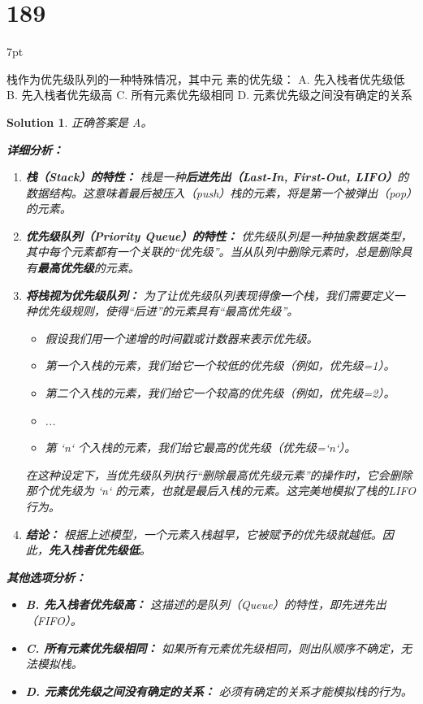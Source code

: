 \documentclass[UTF8]{report}
\newtheorem{solution}{Solution}
\theoremstyle{MyLineTheoremStyle} %
\theoremstyle{MyBlockTheoremStyle} %
\theoremstyle{MySubsubsectionStyle} %
\newenvironment{graybox}{%
        \def\FrameCommand{%
        \hspace{1pt}%
        {\color{gray}\small \vrule width 2pt}%
        {\color{graybox_color}\vrule width 4pt}%
        \colorbox{graybox_color}%
        }%
        \MakeFramed{\advance\hsize-\width\FrameRestore}%
        \noindent\hspace{-4.55pt}%
        \begin{adjustwidth}{}{7pt}%
        \vspace{2pt}\vspace{2pt}%
        }
        {%
        \vspace{2pt}\end{adjustwidth}\endMakeFramed%
        }
\begin{document}
\section*{189}
\begin{graybox}
栈作为优先级队列的一种特殊情况，其中元
素的优先级：
A. 先入栈者优先级低
B. 先入栈者优先级高
C. 所有元素优先级相同
D. 元素优先级之间没有确定的关系
\end{graybox}

\begin{solution}
正确答案是 A。

\textbf{详细分析：}

\begin{enumerate}
    \item \textbf{栈（Stack）的特性：}
    栈是一种\textbf{后进先出（Last-In, First-Out, LIFO）}的数据结构。这意味着最后被压入（push）栈的元素，将是第一个被弹出（pop）的元素。

    \item \textbf{优先级队列（Priority Queue）的特性：}
    优先级队列是一种抽象数据类型，其中每个元素都有一个关联的“优先级”。当从队列中删除元素时，总是删除具有\textbf{最高优先级}的元素。

    \item \textbf{将栈视为优先级队列：}
    为了让优先级队列表现得像一个栈，我们需要定义一种优先级规则，使得“后进”的元素具有“最高优先级”。
    \begin{itemize}
        \item 假设我们用一个递增的时间戳或计数器来表示优先级。
        \item 第一个入栈的元素，我们给它一个较低的优先级（例如，优先级=1）。
        \item 第二个入栈的元素，我们给它一个较高的优先级（例如，优先级=2）。
        \item ...
        \item 第 `n` 个入栈的元素，我们给它最高的优先级（优先级=`n`）。
    \end{itemize}
    在这种设定下，当优先级队列执行“删除最高优先级元素”的操作时，它会删除那个优先级为 `n` 的元素，也就是最后入栈的元素。这完美地模拟了栈的LIFO行为。

    \item \textbf{结论：}
    根据上述模型，一个元素入栈越早，它被赋予的优先级就越低。因此，\textbf{先入栈者优先级低}。
\end{enumerate}

\textbf{其他选项分析：}
\begin{itemize}
    \item \textbf{B. 先入栈者优先级高：} 这描述的是队列（Queue）的特性，即先进先出（FIFO）。
    \item \textbf{C. 所有元素优先级相同：} 如果所有元素优先级相同，则出队顺序不确定，无法模拟栈。
    \item \textbf{D. 元素优先级之间没有确定的关系：} 必须有确定的关系才能模拟栈的行为。
\end{itemize}
\end{solution}
\end{document}
